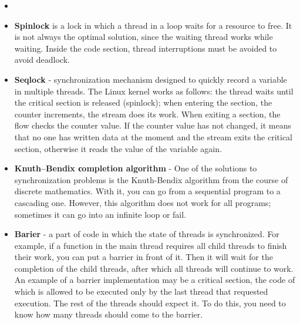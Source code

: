 {\begin{itemize}
			\item{}
			\item\textbf{Spinlock} is a  lock in which a thread in a loop waits for a resource to free. It is not always the optimal solution, since the waiting thread works while waiting. Inside the code section, thread interruptions must be avoided to avoid deadlock.
			\item\textbf{Seqlock} - synchronization mechanism designed to quickly record a variable in multiple threads. The Linux kernel works as follows: the thread waits until the critical section is released (spinlock); when entering the section, the counter increments, the stream does its work. When exiting a section, the flow checks the counter value. If the counter value has not changed, it means that no one has written data at the moment and the stream exits the critical section, otherwise it reads the value of the variable again.
			\item\textbf{Knuth–Bendix сompletion algorithm} - One of the solutions to synchronization problems is the Knuth-Bendix algorithm from the course of discrete mathematics. With it, you can go from a sequential program to a cascading one. However, this algorithm does not work for all programs; sometimes it can go into an infinite loop or fail.
			\item\textbf{Barier} - a part of code in which the state of threads is synchronized. For example, if a function in the main thread requires all child threads to finish their work, you can put a barrier in front of it. Then it will wait for the completion of the child threads, after which all threads will continue to work. An example of a barrier implementation may be a critical section, the code of which is allowed to be executed only by the last thread that requested execution. The rest of the threads should expect it. To do this, you need to know how many threads should come to the barrier.

\end{itemize}}
